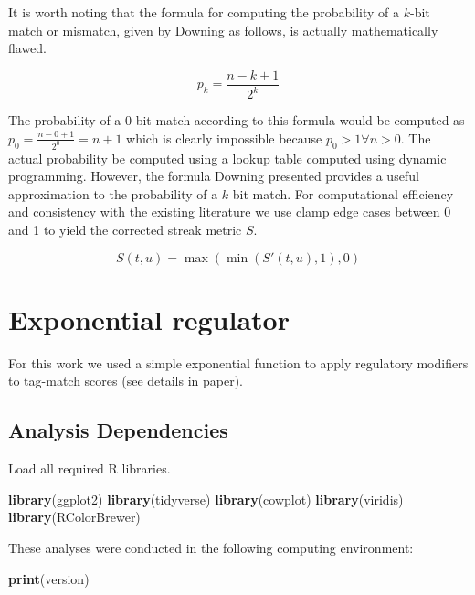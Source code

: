 \documentclass[]{book}
\newenvironment{Shaded}{\begin{snugshade}}{\end{snugshade}}
\newcommand{\KeywordTok}[1]{\textcolor[rgb]{0.13,0.29,0.53}{\textbf{#1}}}
\newcommand{\NormalTok}[1]{#1}
\begin{document}
It is worth noting that the formula for computing the probability of a \(k\)-bit match or mismatch, given by Downing as follows, is actually mathematically flawed.

\[
p_k
= \frac{n - k + 1}{2^k}
\]

The probability of a \(0\)-bit match according to this formula would be computed as \(p_0 = \frac{n - 0 + 1}{2^0} = n + 1\) which is clearly impossible because \(p_0 > 1 \forall n > 0\).
The actual probability be computed using a lookup table computed using dynamic programming.
However, the formula Downing presented provides a useful approximation to the probability of a \(k\) bit match.
For computational efficiency and consistency with the existing literature we use clamp edge cases between 0 and 1 to yield the corrected streak metric \(S\).

\[
S(t, u) =
\max( \min( S'(t, u), 1), 0)
\]

\hypertarget{exponential-regulator}{%
\chapter{Exponential regulator}\label{exponential-regulator}}

For this work we used a simple exponential function to apply regulatory modifiers to tag-match scores (see details in paper).

\hypertarget{analysis-dependencies}{%
\section{Analysis Dependencies}\label{analysis-dependencies}}

Load all required R libraries.

\begin{Shaded}
\begin{Highlighting}[]
\KeywordTok{library}\NormalTok{(ggplot2)}
\KeywordTok{library}\NormalTok{(tidyverse)}
\KeywordTok{library}\NormalTok{(cowplot)}
\KeywordTok{library}\NormalTok{(viridis)}
\KeywordTok{library}\NormalTok{(RColorBrewer)}
\end{Highlighting}
\end{Shaded}

These analyses were conducted in the following computing environment:

\begin{Shaded}
\begin{Highlighting}[]
\KeywordTok{print}\NormalTok{(version)}
\end{Highlighting}
\end{Shaded}
\end{document}
